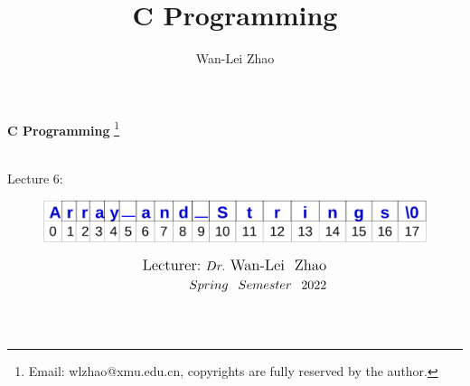 \documentclass[]{beamer}
\title{C Programming}
\author{Wan-Lei Zhao}
\newcommand\blfootnote[1]{
  \begingroup
  \renewcommand\thefootnote{}\footnote{#1}
  \addtocounter{footnote}{-1}
  \endgroup
}
\begin{document}
\begin{frame}
   \begin{center}
    \vspace{24pt}
    \Huge\textbf{C Programming}\blfootnote{Email: wlzhao@xmu.edu.cn, copyrights are fully reserved by the author.}\\
     \Huge{Lecture 6: }\\
     \begin{figure}
     	\begin{center}
     		\includegraphics[width=0.75\linewidth]{figs/array_symb.pdf}
     	\end{center}
     \end{figure}
    \vspace{36pt}
  \end{center}
  \begin{align*}
   \vspace{18pt}
      \large{\mbox{Lecturer:}~Dr.~\mbox{Wan-Lei~~Zhao}} \\
      \large{Spring~~Semester~~2022} \\
   \vspace{30pt}
  \end{align*}
\end{frame}




\section{}
\end{document}
